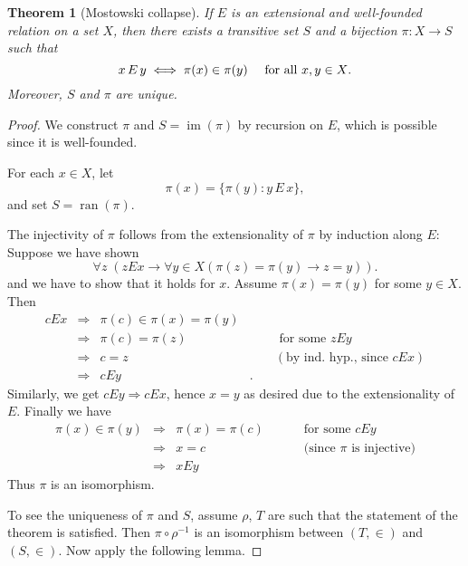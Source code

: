 \documentclass{article}
\newcommand{\Op}[1]{\operatorname{#1}}
\newtheorem{theorem}{Theorem}[section]
\begin{document}
\begin{theorem}[Mostowski collapse]\label{thm-mostowski-collapse}If $E$ is an extensional and well-founded relation on a set $X$, then there exists a transitive set $S$ and a bijection $\pi: X \to S$ such that
\begin{equation*}
x \, E \, y \iff \pi(x) \in \pi(y) \quad \text{ for all $ x,y \in X$}.
\end{equation*}
Moreover, $S$ and ${}\pi$ are unique.

\end{theorem}\begin{proof}We construct ${}\pi$ and $S = \Op{im}(\pi)$ by recursion on $E$, which is possible since it is well-founded.

For each $x \in X$, let
\begin{equation*}
\pi(x) = \{\pi(y) \colon y \, E \, x \},
\end{equation*}
and set $S = \Op{ran}(\pi)$.

The injectivity of ${}\pi$ follows from the extensionality of ${}\pi$ by induction along $E$: 	
Suppose we have shown
\begin{equation*}
\forall z \; (z E x \to \forall y  \in X (\pi(z) = \pi(y) \to z = y)).
\end{equation*}
and we have to show that it holds for $x$. Assume $\pi(x) = \pi(y)$ for some $y \in X$. Then
\begin{align*}
cEx &\Rightarrow& \pi(c) \in \pi(x) = \pi(y) &\\
&\Rightarrow& \pi(c) = \pi(z) & \qquad \text{ for some } zEy\\
&\Rightarrow& c=z & \qquad  (\text{by ind. hyp., since } cEx)\\
&\Rightarrow& cEy &.
\end{align*}
Similarly, we get $cEy \Rightarrow cEx$, hence $x=y$ as desired due to the extensionality of $E$. Finally we have
\begin{align*}
\pi(x) \in \pi(y) & \Rightarrow & \pi(x) = \pi(c) & \qquad \text{ for some } cEy \\
&\Rightarrow& x = c & \qquad \text{ (since ${}\pi$ is injective)}\\
&\Rightarrow& xEy &
\end{align*}
Thus ${}\pi$ is an isomorphism.

To see the uniqueness of ${}\pi$ and $S$, assume $\rho$, $T$ are such that the statement of the theorem is satisfied. Then $\pi \circ \rho^{ -1}$ is an isomorphism between $(T, \in)$ and $(S,\in)$. Now apply the following lemma.


\end{proof}
\end{document}
